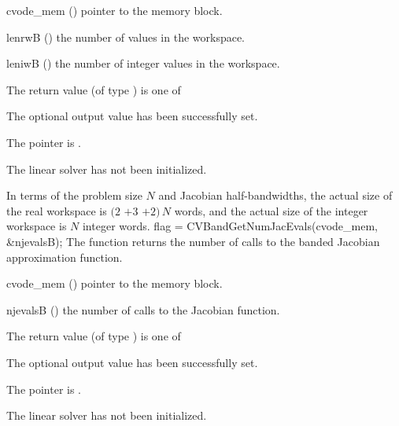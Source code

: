 {
  \begin{args}
  \item[cvode\_mem] ()
    pointer to the {\cvode} memory block.
  \item[lenrwB] ()
    the number of  values in the {\cvband} workspace.
  \item[leniwB] ()
    the number of integer values in the {\cvband} workspace.
  \end{args}
}
{
  The return value  (of type ) is one of
  \begin{args}
  \item[\Id{CVBAND\_SUCCESS}] 
    The optional output value has been successfully set.
  \item[\Id{CVBAND\_MEM\_NULL}]
    The  pointer is .
  \item[\Id{CVBAND\_LMEM\_NULL}]
    The {\cvband} linear solver has not been initialized.
  \end{args}
}
{
  In terms of the problem size $N$ and Jacobian half-bandwidths, 
  the actual size of the real workspace is
  $(2$ $+ 3$  $+ 2)\, N$  words,
  and the actual size of the integer workspace is $N$ integer words.
}
{
  flag = CVBandGetNumJacEvals(cvode\_mem, \&njevalsB);
}
{
  The function  returns the
  number of calls to the banded Jacobian approximation function.
}
{
  \begin{args}
  \item[cvode\_mem] ()
    pointer to the {\cvode} memory block.
  \item[njevalsB] ()
    the number of calls to the Jacobian function.
  \end{args}
}
{
  The return value  (of type ) is one of
  \begin{args}
  \item[\Id{CVBAND\_SUCCESS}] 
    The optional output value has been successfully set.
  \item[\Id{CVBAND\_MEM\_NULL}]
    The  pointer is .
  \item[\Id{CVBAND\_LMEM\_NULL}]
    The {\cvband} linear solver has not been initialized.
  \end{args}
}
